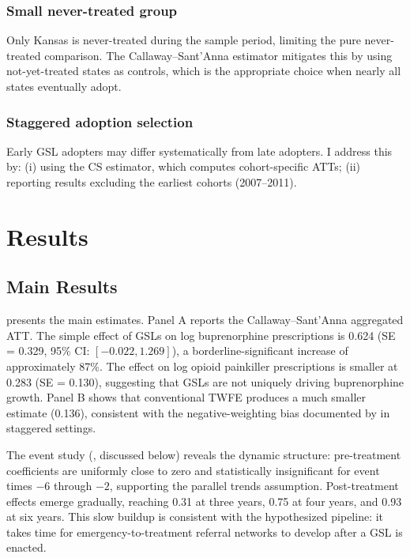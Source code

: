\documentclass[12pt]{article}
\begin{document}
\subsubsection*{Small never-treated group} Only Kansas is never-treated during the sample period, limiting the pure never-treated comparison. The Callaway--Sant'Anna estimator mitigates this by using not-yet-treated states as controls, which is the appropriate choice when nearly all states eventually adopt.

\subsubsection*{Staggered adoption selection} Early GSL adopters may differ systematically from late adopters. I address this by: (i) using the CS estimator, which computes cohort-specific ATTs; (ii) reporting results excluding the earliest cohorts (2007--2011).

\section{Results}

\subsection{Main Results}



 presents the main estimates. Panel A reports the Callaway--Sant'Anna aggregated ATT. The simple effect of GSLs on log buprenorphine prescriptions is 0.624 (SE = 0.329, 95\% CI: $[-0.022, 1.269]$), a borderline-significant increase of approximately 87\%. The effect on log opioid painkiller prescriptions is smaller at 0.283 (SE = 0.130), suggesting that GSLs are not uniquely driving buprenorphine growth. Panel B shows that conventional TWFE produces a much smaller estimate (0.136), consistent with the negative-weighting bias documented by \citet{goodmanbacon2021} in staggered settings.

The event study (, discussed below) reveals the dynamic structure: pre-treatment coefficients are uniformly close to zero and statistically insignificant for event times $-6$ through $-2$, supporting the parallel trends assumption. Post-treatment effects emerge gradually, reaching 0.31 at three years, 0.75 at four years, and 0.93 at six years. This slow buildup is consistent with the hypothesized pipeline: it takes time for emergency-to-treatment referral networks to develop after a GSL is enacted.
\end{document}
